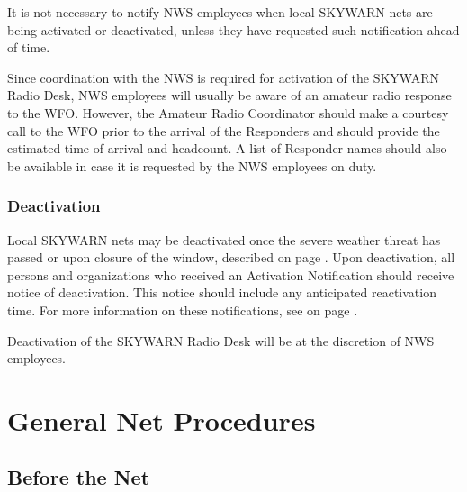 \documentclass[pdflatex,letterpaper,twoside,12pt]{book}
\begin{document}
It is not necessary to notify NWS employees when local SKYWARN nets are being activated or deactivated, unless they have requested such notification ahead of time.

Since coordination with the NWS is required for activation of the SKYWARN Radio Desk, NWS employees will usually be aware of an amateur radio response to the WFO.  However, the Amateur Radio Coordinator should make a courtesy call to the WFO prior to the arrival of the Responders and should provide the estimated time of arrival and headcount.  A list of Responder names should also be available in case it is requested by the NWS employees on duty.

\subsection{Deactivation}

Local SKYWARN nets may be deactivated once the severe weather threat has passed or upon closure of the  window, described on page \pageref{daytime-criteria}.  Upon deactivation, all persons and organizations who received an Activation Notification should receive notice of deactivation.  This notice should include any anticipated reactivation time.  For more information on these notifications, see  on page \pageref{team-notification}.

Deactivation of the SKYWARN Radio Desk will be at the discretion of NWS employees.


\chapter{General Net Procedures}


\section{Before the Net}
\end{document}
